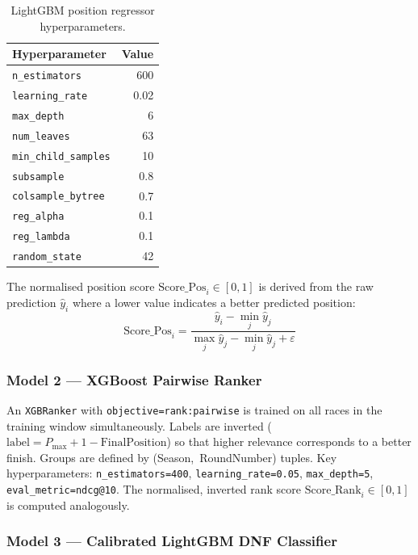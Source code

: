 \documentclass[12pt, a4paper, oneside]{report}
\begin{document}
\begin{table}[H]
\centering
\caption{LightGBM position regressor hyperparameters.}
\label{tab:lgbm-hparams}
\begin{tabular}{@{} l r @{}}
  \toprule
  \textbf{Hyperparameter} & \textbf{Value} \\
  \midrule
  \texttt{n\_estimators}       & 600 \\
  \texttt{learning\_rate}      & 0.02 \\
  \texttt{max\_depth}          & 6 \\
  \texttt{num\_leaves}         & 63 \\
  \texttt{min\_child\_samples} & 10 \\
  \texttt{subsample}           & 0.8 \\
  \texttt{colsample\_bytree}   & 0.7 \\
  \texttt{reg\_alpha}          & 0.1 \\
  \texttt{reg\_lambda}         & 0.1 \\
  \texttt{random\_state}       & 42 \\
  \bottomrule
\end{tabular}
\end{table}

The normalised position score $\text{Score\_Pos}_i \in [0,1]$ is derived from
the raw prediction $\hat{y}_i$ where a lower value indicates a better predicted
position:
\[
\text{Score\_Pos}_i = \frac{\hat{y}_i - \min_j \hat{y}_j}{\max_j \hat{y}_j - \min_j \hat{y}_j + \varepsilon}
\]

\subsubsection*{Model 2 --- XGBoost Pairwise Ranker}

An \texttt{XGBRanker} with \texttt{objective=rank:pairwise} is trained on all
races in the training window simultaneously. Labels are inverted
($\text{label} = P_{\max}+1-\text{FinalPosition}$) so that higher relevance
corresponds to a better finish. Groups are defined by (Season,~RoundNumber)
tuples. Key hyperparameters: \texttt{n\_estimators=400},
\texttt{learning\_rate=0.05}, \texttt{max\_depth=5},
\texttt{eval\_metric=ndcg@10}. The normalised, inverted rank score
$\text{Score\_Rank}_i \in [0,1]$ is computed analogously.

\subsubsection*{Model 3 --- Calibrated LightGBM DNF Classifier}
\end{document}
